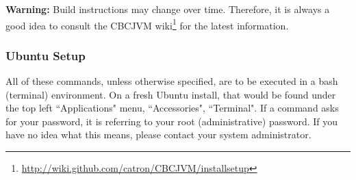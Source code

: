 \documentclass[10pt,letterpaper]{article}
\newcommand{\urlfootnote}[1]{\footnote{\url{#1}}}
\begin{document}
\textbf{Warning: } Build instructions may change over time. Therefore, it is always a good idea to consult the CBCJVM wiki\urlfootnote{http://wiki.github.com/catron/CBCJVM/installsetup} for the latest information.

\subsubsection{Ubuntu Setup}

All of these commands, unless otherwise specified, are to be executed in a bash (terminal) environment. On a fresh Ubuntu install, that would be found under the top left ``Applications" menu, ``Accessories", ``Terminal". If a command asks for your password, it is referring to your root (administrative) password. If you have no idea what this means, please contact your system administrator.
\end{document}
